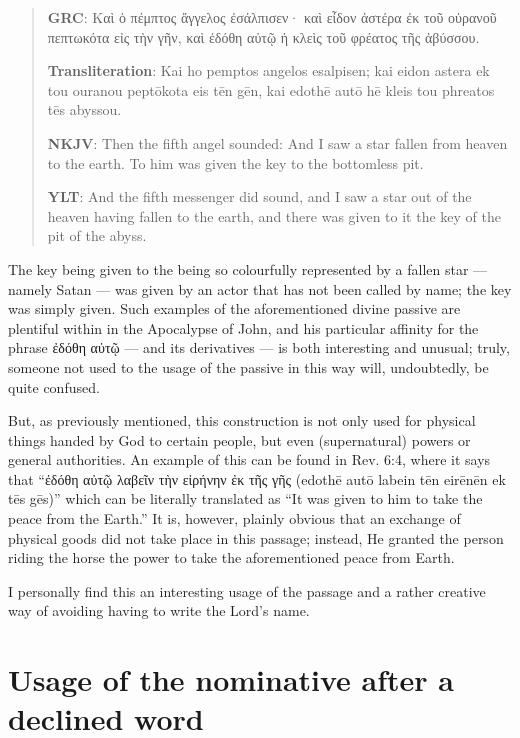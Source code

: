 \begin{quote}

\textbf{GRC}: Καὶ ὁ πέμπτος ἄγγελος ἐσάλπισεν· καὶ εἶδον ἀστέρα ἐκ τοῦ οὐρανοῦ πεπτωκότα εἰς τὴν γῆν, καὶ ἐδόθη αὐτῷ ἡ κλεὶς τοῦ φρέατος τῆς ἀβύσσου. 

\textbf{Transliteration}: Kai ho pemptos angelos esalpisen; kai eidon astera ek tou ouranou peptōkota eis tēn gēn, kai edothē autō hē kleis tou phreatos tēs abyssou. 

\bigskip

\textbf{NKJV}: Then the fifth angel sounded: And I saw a star fallen from heaven to the earth. To him was given the key to the bottomless pit. 

\textbf{YLT}: And the fifth messenger did sound, and I saw a star out of the heaven having fallen to the earth, and there was given to it the key of the pit of the abyss.
\end{quote}

The key being given to the being so colourfully represented by a fallen star — namely Satan — was given by an actor that has not been called by name; the key was simply given. Such examples of the aforementioned divine passive are plentiful within in the Apocalypse of John, and his particular affinity for the phrase ἐδόθη αὐτῷ — and its derivatives — is both interesting and unusual; truly, someone not used to the usage of the passive in this way will, undoubtedly, be quite confused.

But, as previously mentioned, this construction is not only used for physical things handed by God to certain people, but even (supernatural) powers or general authorities. An example of this can be found in Rev. 6:4, where it says that “ἐδόθη αὐτῷ λαβεῖν τὴν εἰρήνην ἐκ τῆς γῆς (edothē autō labein tēn eirēnēn ek tēs gēs)” which can be literally translated as “It was given to him to take the peace from the Earth.” It is, however, plainly obvious that an exchange of physical goods did not take place in this passage; instead, He granted the person riding the horse the power to take the aforementioned peace from Earth.

I personally find this an interesting usage of the passage and a rather creative way of avoiding having to write the Lord’s name.

\section*{Usage of the nominative after a declined word}
  
